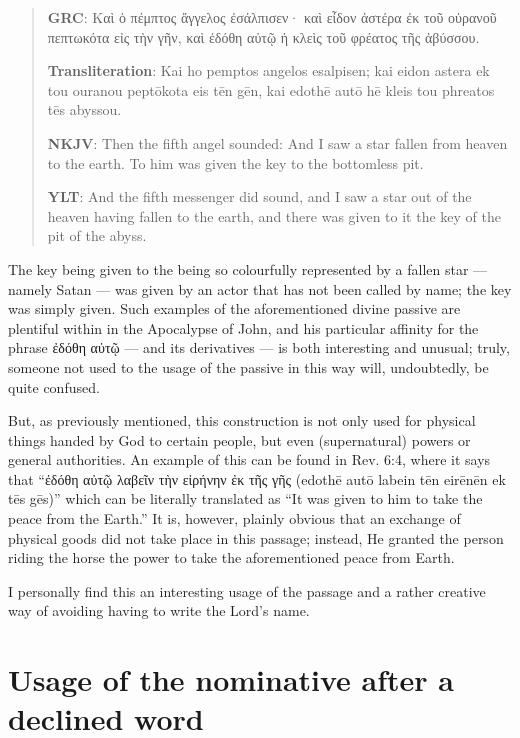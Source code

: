 \begin{quote}

\textbf{GRC}: Καὶ ὁ πέμπτος ἄγγελος ἐσάλπισεν· καὶ εἶδον ἀστέρα ἐκ τοῦ οὐρανοῦ πεπτωκότα εἰς τὴν γῆν, καὶ ἐδόθη αὐτῷ ἡ κλεὶς τοῦ φρέατος τῆς ἀβύσσου. 

\textbf{Transliteration}: Kai ho pemptos angelos esalpisen; kai eidon astera ek tou ouranou peptōkota eis tēn gēn, kai edothē autō hē kleis tou phreatos tēs abyssou. 

\bigskip

\textbf{NKJV}: Then the fifth angel sounded: And I saw a star fallen from heaven to the earth. To him was given the key to the bottomless pit. 

\textbf{YLT}: And the fifth messenger did sound, and I saw a star out of the heaven having fallen to the earth, and there was given to it the key of the pit of the abyss.
\end{quote}

The key being given to the being so colourfully represented by a fallen star — namely Satan — was given by an actor that has not been called by name; the key was simply given. Such examples of the aforementioned divine passive are plentiful within in the Apocalypse of John, and his particular affinity for the phrase ἐδόθη αὐτῷ — and its derivatives — is both interesting and unusual; truly, someone not used to the usage of the passive in this way will, undoubtedly, be quite confused.

But, as previously mentioned, this construction is not only used for physical things handed by God to certain people, but even (supernatural) powers or general authorities. An example of this can be found in Rev. 6:4, where it says that “ἐδόθη αὐτῷ λαβεῖν τὴν εἰρήνην ἐκ τῆς γῆς (edothē autō labein tēn eirēnēn ek tēs gēs)” which can be literally translated as “It was given to him to take the peace from the Earth.” It is, however, plainly obvious that an exchange of physical goods did not take place in this passage; instead, He granted the person riding the horse the power to take the aforementioned peace from Earth.

I personally find this an interesting usage of the passage and a rather creative way of avoiding having to write the Lord’s name.

\section*{Usage of the nominative after a declined word}
  
